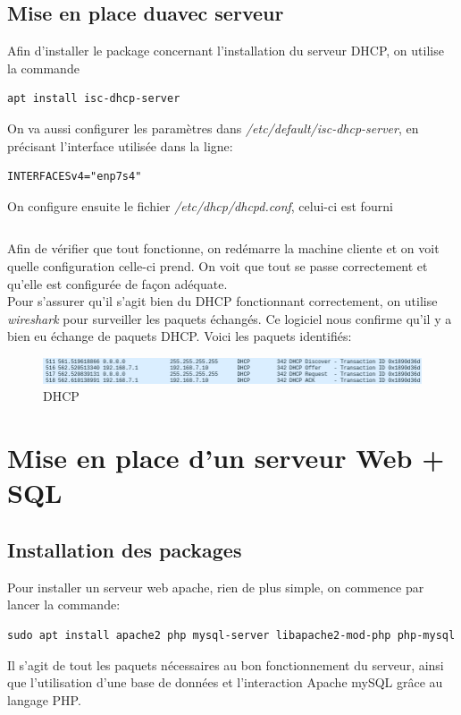 \subsection{Mise en place duavec  serveur}
Afin d'installer le package concernant l'installation du serveur DHCP, on utilise la commande

\begin{verbatim}
apt install isc-dhcp-server
\end{verbatim}

On va aussi configurer les paramètres dans \textit{/etc/default/isc-dhcp-server}, en précisant l'interface utilisée dans la ligne:

\begin{verbatim}
INTERFACESv4="enp7s4"
\end{verbatim}

On configure ensuite le fichier \textit{/etc/dhcp/dhcpd.conf}, celui-ci est fourni

\inputminted[linenos]{bash}{../sources/TP3/server/dhcp/dhcpd.conf}

Afin de vérifier que tout fonctionne, on redémarre la machine cliente et on voit quelle configuration celle-ci prend. On voit que tout se passe correctement et qu'elle est configurée de façon adéquate.\\
Pour s'assurer qu'il s'agit bien du DHCP fonctionnant correctement, on utilise \textit{wireshark} pour surveiller les paquets échangés. Ce logiciel nous confirme qu'il y a bien eu échange de paquets DHCP. Voici les paquets identifiés:

\begin{figure}[H]
\centering
\includegraphics[width=400pt]{./TP3/Pictures/DHCP}
\caption{DHCP}
\label{DHCP}
\end{figure}

\section{Mise en place d’un serveur Web + SQL}
\subsection{Installation des packages}
Pour installer un serveur web apache, rien de plus simple, on commence par lancer la commande:
\begin{verbatim}
sudo apt install apache2 php mysql-server libapache2-mod-php php-mysql
\end{verbatim}
Il s'agit de tout les paquets nécessaires au bon fonctionnement du serveur, ainsi que l'utilisation d'une base de données et l'interaction Apache mySQL grâce au langage PHP.

